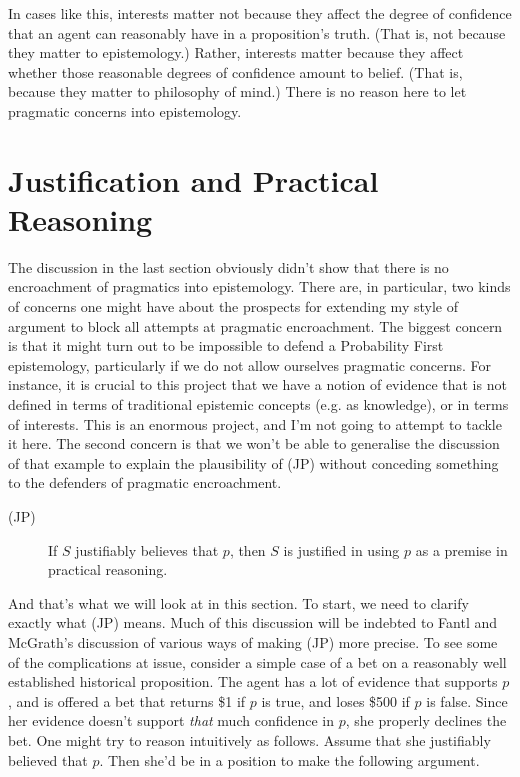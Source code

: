 In cases like this, interests matter not because they affect the degree of confidence that an agent can reasonably have in a proposition's truth. (That is, not because they matter to epistemology.) Rather, interests matter because they affect whether those reasonable degrees of confidence amount to belief. (That is, because they matter to philosophy of mind.) There is no reason here to let pragmatic concerns into epistemology.


\section{Justification and Practical Reasoning}

The discussion in the last section obviously didn't show that there is no encroachment of pragmatics into epistemology. There are, in particular, two kinds of concerns one might have about the prospects for extending my style of argument to block all attempts at pragmatic encroachment. The biggest concern is that it might turn out to be impossible to defend a Probability First epistemology, particularly if we do not allow ourselves pragmatic concerns. For instance, it is crucial to this project that we have a notion of evidence that is not defined in terms of traditional epistemic concepts (e.g. as knowledge), or in terms of interests. This is an enormous project, and I'm not going to attempt to tackle it here. The second concern is that we won't be able to generalise the discussion of that example to explain the plausibility of (JP) without conceding something to the defenders of pragmatic encroachment.

\begin{description}
\item[(JP)] If \(S\)  justifiably believes that \(p\), then \(S\)  is justified in using \(p\) as a premise in practical reasoning.
\end{description}

\noindent And that's what we will look at in this section. To start, we need to clarify exactly what (JP) means. Much of this discussion will be indebted to Fantl and McGrath's discussion of various ways of making (JP) more precise. To see some of the complications at issue, consider a simple case of a bet on a reasonably well established historical proposition. The agent has a lot of evidence that supports \(p\), and is offered a bet that returns \$1 if \(p\) is true, and loses \$500 if \(p\) is false. Since her evidence doesn't support \textit{that} much confidence in \(p\), she properly declines the bet. One might try to reason intuitively as follows. Assume that she justifiably believed that \(p\). Then she'd be in a position to make the following argument.

